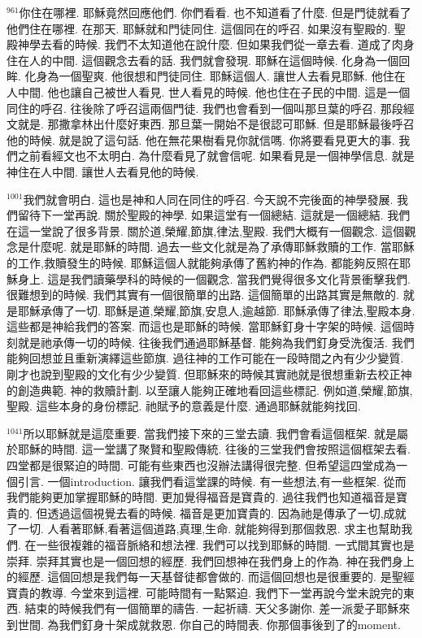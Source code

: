 \documentclass{book}
\begin{document}
$^{961}$你住在哪裡.
耶穌竟然回應他們.
你們看看.
也不知道看了什麼.
但是門徒就看了他們住在哪裡.
在那天.
耶穌就和門徒同住.
這個同在的呼召.
如果沒有聖殿的.
聖殿神學去看的時候.
我們不太知道他在說什麼.
但如果我們從一章去看.
道成了肉身住在人的中間.
這個觀念去看的話.
我們就會發現.
耶穌在這個時候.
化身為一個回眸.
化身為一個聖爽.
他很想和門徒同住.
耶穌這個人.
讓世人去看見耶穌.
他住在人中間.
他也讓自己被世人看見.
世人看見的時候.
他也住在子民的中間.
這是一個同住的呼召.
往後除了呼召這兩個門徒.
我們也會看到一個叫那旦葉的呼召.
那段經文就是.
那撒拿林出什麼好東西.
那旦葉一開始不是很認可耶穌.
但是耶穌最後呼召他的時候.
就是說了這句話.
他在無花果樹看見你就信嗎.
你將要看見更大的事.
我們之前看經文也不太明白.
為什麼看見了就會信呢.
如果看見是一個神學信息.
就是神住在人中間.
讓世人去看見他的時候.

$^{1001}$我們就會明白.
這也是神和人同在同住的呼召.
今天說不完後面的神學發展.
我們留待下一堂再說.
關於聖殿的神學.
如果這堂有一個總結.
這就是一個總結.
我們在這一堂說了很多背景.
關於道,榮耀,節旗,律法,聖殿.
我們大概有一個觀念.
這個觀念是什麼呢.
就是耶穌的時間.
過去一些文化就是為了承傳耶穌救贖的工作.
當耶穌的工作,救贖發生的時候.
耶穌這個人就能夠承傳了舊約神的作為.
都能夠反照在耶穌身上.
這是我們讀藥學科的時候的一個觀念.
當我們覺得很多文化背景衝擊我們.
很難想到的時候.
我們其實有一個很簡單的出路.
這個簡單的出路其實是無敵的.
就是耶穌承傳了一切.
耶穌是道,榮耀,節旗,安息人,逾越節.
耶穌承傳了律法,聖殿本身.
這些都是神給我們的答案.
而這也是耶穌的時候.
當耶穌釘身十字架的時候.
這個時刻就是祂承傳一切的時候.
往後我們通過耶穌基督.
能夠為我們釘身受洗復活.
我們能夠回想並且重新演繹這些節旗.
過往神的工作可能在一段時間之內有少少變質.
剛才也說到聖殿的文化有少少變質.
但耶穌來的時候其實祂就是很想重新去校正神的創造典範.
神的救贖計劃.
以至讓人能夠正確地看回這些標記.
例如道,榮耀,節旗,聖殿.
這些本身的身份標記.
祂賦予的意義是什麼.
通過耶穌就能夠找回.

$^{1041}$所以耶穌就是這麼重要.
當我們接下來的三堂去讀.
我們會看這個框架.
就是屬於耶穌的時間.
這一堂講了聚賢和聖殿傳統.
往後的三堂我們會按照這個框架去看.
四堂都是很緊迫的時間.
可能有些東西也沒辦法講得很完整.
但希望這四堂成為一個引言.
一個introduction.
讓我們看這堂課的時候.
有一些想法,有一些框架.
從而我們能夠更加掌握耶穌的時間.
更加覺得福音是寶貴的.
過往我們也知道福音是寶貴的.
但透過這個視覺去看的時候.
福音是更加寶貴的.
因為祂是傳承了一切,成就了一切.
人看著耶穌,看著這個道路,真理,生命.
就能夠得到那個救恩.
求主也幫助我們.
在一些很複雜的福音脈絡和想法裡.
我們可以找到耶穌的時間.
一式間其實也是崇拜.
崇拜其實也是一個回想的經歷.
我們回想神在我們身上的作為.
神在我們身上的經歷.
這個回想是我們每一天基督徒都會做的.
而這個回想也是很重要的.
是聖經寶貴的教導.
今堂來到這裡.
可能時間有一點緊迫.
我們下一堂再說今堂未說完的東西.
結束的時候我們有一個簡單的禱告.
一起祈禱.
天父多謝你.
差一派愛子耶穌來到世間.
為我們釘身十架成就救恩.
你自己的時間表.
你那個事後到了的moment.
\end{document}
